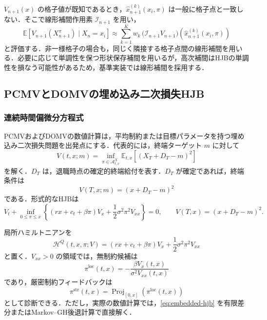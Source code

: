 \documentclass[10pt,a4paper]{article}
\theoremstyle{plain}
\theoremstyle{definition}
\newcommand{\E}{\mathbb{E}}
\DeclareMathOperator{\Proj}{Proj}
\newcommand{\A}{\mathcal{A}}
\newcommand{\Hamil}{\mathcal{H}}
\begin{document}
$V_{n+1}(x)$ の格子値が既知であるとき，$\widehat{x}_{n+1}^{(k)}(x_i,\pi)$ は一般に格子点と一致しない．そこで線形補間作用素 $\mathcal I_{n+1}$ を用い，
\begin{equation}
  \E\left[V_{n+1}(X_{n+1}^{\pi})\mid X_n=x_i\right]
  \approx
  \sum_{k=1}^K w_k\,
  \bigl(\mathcal I_{n+1}V_{n+1}\bigr)
  \left(\widehat{x}_{n+1}^{(k)}(x_i,\pi)\right)
  \label{eq:gh-expectation}
\end{equation}
と評価する．非一様格子の場合も，同じく隣接する格子点間の線形補間を用いる．必要に応じて単調性を保つ形状保存補間を用いるが，高次補間はHJBの単調性を損なう可能性があるため，基準実装では線形補間を採用する．

\subsection{PCMVとDOMVの埋め込み二次損失HJB}
\label{sec:embedded}

\subsubsection{連続時間偏微分方程式}

PCMVおよびDOMVの数値計算は，平均制約または目標パラメータを持つ埋め込み二次損失問題を出発点にする．代表的には，終端ターゲット $m$ に対して
\begin{equation}
  V(t,x;m)=\inf_{\pi\in\A^X_{t,x}}
  \E_{t,x}\left[(X_T+D_T-m)^2\right]
  \label{eq:embedded-value}
\end{equation}
を解く．$D_T$ は，退職時点の確定的終端給付を表す．$D_T$ が確定であれば，終端条件は
\begin{equation}
  V(T,x;m)=(x+D_T-m)^2
  \label{eq:embedded-terminal}
\end{equation}
である．形式的なHJBは
\begin{equation}
  V_t+
  \inf_{0\leq\pi\leq x}
  \left\{
    (rx+c_t+\beta\pi)V_x
    +\frac{1}{2}\sigma^2\pi^2 V_{xx}
  \right\}=0,
  \qquad
  V(T,x)=(x+D_T-m)^2.
  \label{eq:embedded-hjb}
\end{equation}

局所ハミルトニアンを
\begin{equation}
  \Hamil^Q(t,x,\pi;V)
  =(rx+c_t+\beta\pi)V_x
  +\frac{1}{2}\sigma^2\pi^2 V_{xx}
  \label{eq:quadratic-ham}
\end{equation}
と置く．$V_{xx}>0$ の領域では，無制約候補は
\begin{equation}
  \pi^{\mathrm{loc}}(t,x)
  =-\frac{\beta V_x(t,x)}{\sigma^2 V_{xx}(t,x)}
  \label{eq:loc-pi-quadratic}
\end{equation}
であり，厳密制約フィードバックは
\begin{equation}
  \pi^{\mathrm{str}}(t,x)
  =\Proj_{[0,x]}\left(\pi^{\mathrm{loc}}(t,x)\right)
  \label{eq:proj-quadratic}
\end{equation}
として診断できる．ただし，実際の数値計算では，\eqref{eq:embedded-hjb} を有限差分またはMarkov--GH後退計算で直接解く．
\end{document}
